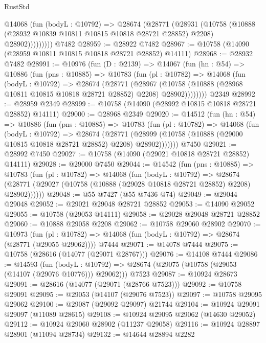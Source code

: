 \begin{lexlean}{RustStd}
\begin{coremodule}
            @14068
              (fun (bodyL : @10792) =>
              @28674
                (@28771
                  (@28931
                    (@10758
                      (@10888 (@28932 @10839 @10811 @10815 @10818 @28721 @28852) @2208)
                      @28902)))))))))
    @7482
@28959 := @28922 @7482
@28967 := @10758 (@14090 (@28959 @10811 @10815 @10818 @28721 @28852) @14111)
@28968 := @28932 @7482
@28991 := @10976
    (fun (D : @2139) =>
    @14067
      (fun (hn : @54) =>
      @10886
        (fun (pns : @10885) =>
        @10783
          (fun (pl : @10782) =>
          @14068
            (fun (bodyL : @10792) =>
            @28674
              (@28771
                (@28967
                  (@10758 (@10888 (@28968 @10811 @10815 @10818 @28721 @28852) @2208) @28902))))))))
    @2349
@28992 := @28959 @2349
@28999 := @10758 (@14090 (@28992 @10815 @10818 @28721 @28852) @14111)
@29000 := @28968 @2349
@29020 := @14512
    (fun (hn : @54) =>
    @10886
      (fun (pns : @10885) =>
      @10783
        (fun (pl : @10782) =>
        @14068
          (fun (bodyL : @10792) =>
          @28674
            (@28771
              (@28999 (@10758 (@10888 (@29000 @10815 @10818 @28721 @28852) @2208) @28902)))))))
    @7450
@29021 := @28992 @7450
@29027 := @10758 (@14090 (@29021 @10818 @28721 @28852) @14111)
@29028 := @29000 @7450
@29044 := @14542
    (fun (pns : @10885) =>
    @10783
      (fun (pl : @10782) =>
      @14068
        (fun (bodyL : @10792) =>
        @28674 (@28771 (@29027 (@10758 (@10888 (@29028 @10818 @28721 @28852) @2208) @28902))))))
@29048 := @55 @7427 (@55 @7436 @74)
@29049 := @29044 @29048
@29052 := @29021 @29048 @28721 @28852
@29053 := @14090 @29052
@29055 := @10758 (@29053 @14111)
@29058 := @29028 @29048 @28721 @28852
@29060 := @10888 @29058 @2208
@29062 := @10758 @29060 @28902
@29070 := @10973
    (fun (pl : @10782) => @14068 (fun (bodyL : @10792) => @28674 (@28771 (@29055 @29062))))
    @7444
@29071 := @14078 @7444
@29075 := @10758 (@28616 (@14077 (@29071 @28767)))
@29076 := @14108 @7444
@29086 := @14593
    (fun (bodyL : @10792) => @28674 (@29075 (@10758 (@29053 (@14107 (@29076 @10776))) @29062)))
    @7523
@29087 := @10924 @28673
@29091 := @28616 (@14077 (@29071 (@28766 @7523)))
@29092 := @10758 @29091
@29095 := @29053 (@14107 (@29076 @7523))
@29097 := @10758 @29095 @29062
@29100 := @29087 (@29092 @29097) @21744
@29104 := @10924 @29091 @29097 (@11089 @28615)
@29108 := @10924 @29095 @29062 (@14630 @29052)
@29112 := @10924 @29060 @28902 (@11237 @29058)
@29116 := @10924 @28897 @28901 (@11094 @28734)
@29132 := @14644
    @28894
    @2282

\end{coremodule}
\end{lexlean}
